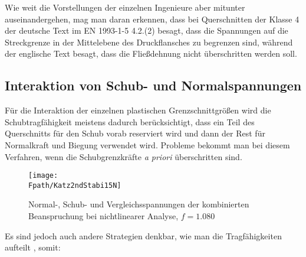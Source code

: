 Wie weit die Vorstellungen der einzelnen Ingenieure aber mitunter auseinandergehen, mag man daran erkennen, dass bei Querschnitten der Klasse 4 der deutsche Text im EN 1993-1-5 4.2.(2) besagt, dass die Spannungen auf die Streckgrenze in der Mittelebene des Druckflansches zu begrenzen sind, w\"{a}hrend der englische Text besagt, dass die Flie{\ss}dehnung nicht \"{u}berschritten werden soll.

{\textcolor{sectionTitleBlue}{\subsection{Interaktion von Schub- und Normalspannungen }}}

F\"{u}r die Interaktion der einzelnen plastischen Grenzschnittgr\"{o}{\ss}en wird die Schubtragf\"{a}higkeit meistens dadurch ber\"{u}cksichtigt, dass ein Teil des Querschnitts f\"{u}r den Schub vorab reserviert wird und dann der Rest f\"{u}r Normalkraft und Biegung verwendet wird. Probleme bekommt man bei diesem Verfahren, wenn die Schubgrenzkr\"{a}fte {\em a priori\/} \"{u}berschritten sind.
\begin{figure}[tbp] \centering
\centering
\if {} \sidecaption[t] \fi
\texttt{[image: \\Fpath/Katz2ndStabi15N]}
\caption{ Normal-, Schub- und Vergleichsspannungen der kombinierten Beanspruchung bei nichtlinearer Analyse, $f = 1.080$
} \label{Katz2ndStabi15}
\end{figure}%
Es sind jedoch auch andere Strategien denkbar, wie man die Tragf\"{a}higkeiten aufteilt \cite{Katz5}, somit:\\

